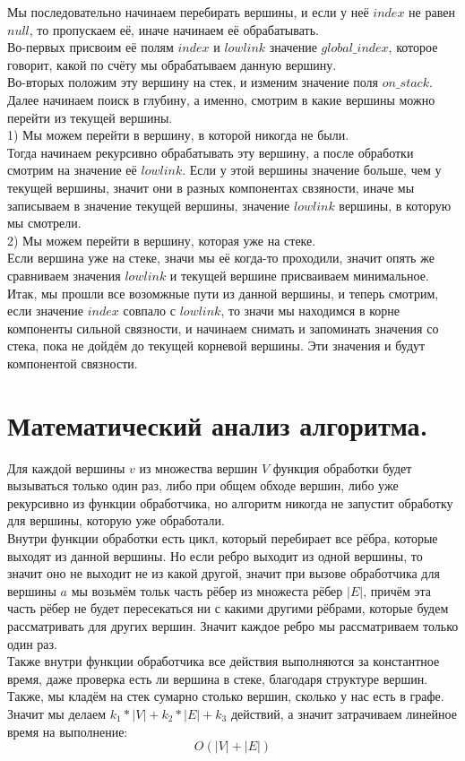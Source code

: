 \documentclass[oneside,final,14pt]{extreport}
\begin{document}
\bigskip
\noindent
Мы последовательно начинаем перебирать вершины, и если у неё $index$ не 
равен $null$, то пропускаем её, иначе начинаем её обрабатывать.\\
Во-первых присвоим её полям $index$ и $lowlink$ значение $global\_index$, 
которое говорит, какой по счёту мы обрабатываем данную вершину.\\
Во-вторых положим эту вершину на стек, и изменим значение поля 
$on\_stack$.\\
Далее начинаем поиск в глубину, а именно, смотрим в какие вершины можно 
перейти из текущей вершины. \\
1) Мы можем перейти в вершину, в которой никогда не были. \\
Тогда начинаем рекурсивно обрабатывать эту вершину, а после обработки
смотрим на значение её $lowlink$. Если у этой вершины значение больше, 
чем у текущей вершины, значит они в разных компонентах свзяности, иначе мы 
записываем в значение текущей вершины, значение $lowlink$ вершины, в
которую мы смотрели.\\
2) Мы можем перейти в вершину, которая уже на стеке. \\
Если вершина уже на стеке, значи мы её когда-то проходили, значит опять же
сравниваем значения $lowlink$ и текущей вершине присваиваем минимальное. \\
Итак, мы прошли все возомжные пути из данной вершины, и теперь смотрим,
если значение $index$ совпало с $lowlink$, то значи мы находимся в корне
компоненты сильной связности, и начинаем снимать и запоминать значения со
стека, пока не дойдём до текущей корневой вершины. Эти значения и будут
компонентой связности.

\newpage
\section{Математический анализ алгоритма.}

\noindent
Для каждой вершины $v$ из множества вершин $V$ функция обработки будет
вызываться только один раз, либо при общем обходе вершин, либо уже
рекурсивно из функции обработчика, 
но алгоритм никогда не запустит обработку для вершины, которую
уже обработали.\\ 
Внутри функции обработки есть цикл, который перебирает все
рёбра, которые выходят из данной вершины. Но если ребро выходит из одной
вершины, то значит оно не выходит не из какой другой, значит при вызове
обработчика для вершины $a$ мы возьмём тольк часть рёбер из множеста рёбер
$|E|$,
причём эта часть рёбер не будет пересекаться ни с какими другими рёбрами,
которые будем рассматривать для других вершин. Значит каждое ребро мы
рассматриваем только один раз. \\
Также внутри функции обработчика все действия выполняются за константное
время, даже проверка есть ли вершина в стеке, благодаря структуре вершин. \\
Также, мы кладём на стек сумарно столько вершин, сколько у нас есть в 
графе. \\
Значит мы делаем $k_1 * |V| + k_2 * |E| + k_3$ действий, а значит
затрачиваем линейное время на выполнение: $$O(|V| + |E|)$$
\end{document}
